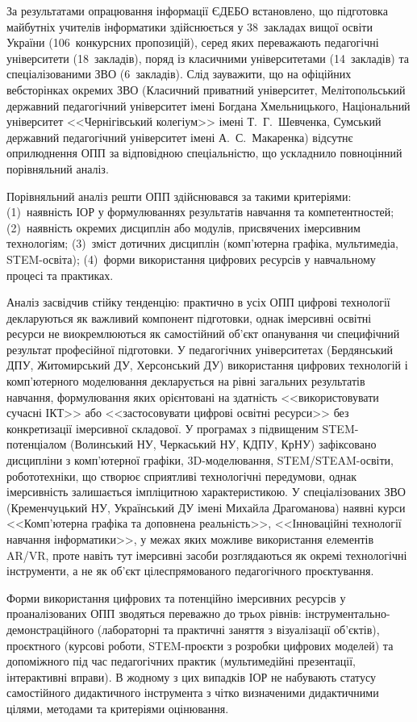 За результатами опрацювання інформації ЄДЕБО встановлено, що підготовка майбутніх учителів інформатики здійснюється у 38~закладах вищої освіти України (106~конкурсних пропозицій), серед яких переважають педагогічні університети (18~закладів), поряд із класичними університетами (14~закладів) та спеціалізованими ЗВО (6~закладів). Слід зауважити, що на офіційних вебсторінках окремих ЗВО (Класичний приватний університет, Мелітопольський державний педагогічний університет імені Богдана Хмельницького, Національний університет <<Чернігівський колегіум>> імені Т.~Г.~Шевченка, Сумський державний педагогічний університет імені А.~С.~Макаренка) відсутнє оприлюднення ОПП за відповідною спеціальністю, що ускладнило повноцінний порівняльний аналіз.

Порівняльний аналіз решти ОПП здійснювався за такими критеріями: (1)~наявність ІОР у формулюваннях результатів навчання та компетентностей; (2)~наявність окремих дисциплін або модулів, присвячених імерсивним технологіям; (3)~зміст дотичних дисциплін (комп'ютерна графіка, мультимедіа, STEM-освіта); (4)~форми використання цифрових ресурсів у навчальному процесі та практиках.

Аналіз засвідчив стійку тенденцію: практично в усіх ОПП цифрові технології декларуються як важливий компонент підготовки, однак імерсивні освітні ресурси не виокремлюються як самостійний об'єкт опанування чи специфічний результат професійної підготовки. У педагогічних університетах (Бердянський ДПУ, Житомирський ДУ, Херсонський ДУ) використання цифрових технологій і комп'ютерного моделювання декларується на рівні загальних результатів навчання, формулювання яких орієнтовані на здатність <<використовувати сучасні ІКТ>> або <<застосовувати цифрові освітні ресурси>> без конкретизації імерсивної складової. У програмах з підвищеним STEM-потенціалом (Волинський НУ, Черкаський НУ, КДПУ, КрНУ) зафіксовано дисципліни з комп'ютерної графіки, 3D-моделювання, STEM/STEAM-освіти, робототехніки, що створює сприятливі технологічні передумови, однак імерсивність залишається імпліцитною характеристикою. У спеціалізованих ЗВО (Кременчуцький НУ, Український ДУ імені Михайла Драгоманова) наявні курси <<Комп'ютерна графіка та доповнена реальність>>, <<Інноваційні технології навчання інформатики>>, у межах яких можливе використання елементів AR/VR, проте навіть тут імерсивні засоби розглядаються як окремі технологічні інструменти, а не як об'єкт цілеспрямованого педагогічного проєктування.

Форми використання цифрових та потенційно імерсивних ресурсів у проаналізованих ОПП зводяться переважно до трьох рівнів: інструментально-демонстраційного (лабораторні та практичні заняття з візуалізації об'єктів), проєктного (курсові роботи, STEM-проєкти з розробки цифрових моделей) та допоміжного під час педагогічних практик (мультимедійні презентації, інтерактивні вправи). В жодному з цих випадків ІОР не набувають статусу самостійного дидактичного інструмента з чітко визначеними дидактичними цілями, методами та критеріями оцінювання.

